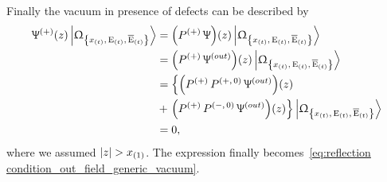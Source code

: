 Finally the vacuum in presence of defects can be  described by
\begin{equation}
  \begin{split}
    \Psi^{(+)}( z ) \Gexcvacket
    & =
    \qty(P^{(+)}\, \Psi)( z ) \Gexcvacket
    \\
    & =
    \qty(P^{(+)}\, \Psi^{(out)})( z ) \Gexcvacket
    \\
    & =
    \left\lbrace
      \qty(P^{(+)}\, P^{(+,\, 0)}\, \Psi^{(out)})( z )
    \right.
    \\
    & +
    \left.
      \qty(P^{(+)}\, P^{(-,\, 0)}\, \Psi^{(out)})( z )
    \right\rbrace
    \Gexcvacket
    \\
    & =
    0,
  \end{split}
\end{equation}
where we assumed $\abs{z} > x_{(1)}$.
The expression finally becomes~\eqref{eq:reflection condition_out_field_generic_vacuum}.

